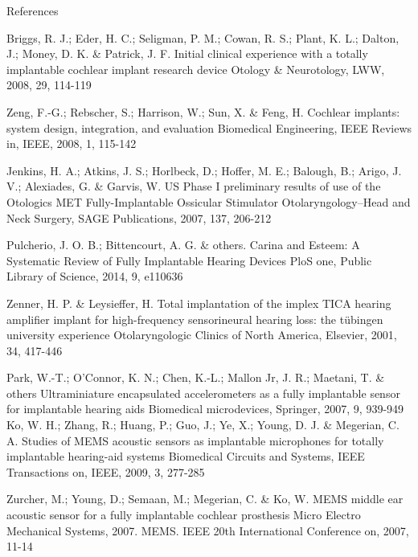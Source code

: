\documentclass[dvipsnames,12pt]{beamer}
\begin{document}
\begin{frame}[allowframebreaks]{References}
 
 
 \renewcommand{\refname}{\normalfont\selectfont\normalsize}
 \justifying
 \begin{thebibliography}{5}
\begin{footnotesize}
\begin{justifying}


Briggs, R. J.; Eder, H. C.; Seligman, P. M.; Cowan, R. S.; Plant, K. L.; Dalton, J.; Money, D. K. \& Patrick, J. F. Initial clinical experience with a totally implantable cochlear implant research device Otology \& Neurotology, LWW, 2008, 29, 114-119

Zeng, F.-G.; Rebscher, S.; Harrison, W.; Sun, X. \& Feng, H. Cochlear implants: system design, integration, and evaluation Biomedical Engineering, IEEE Reviews in, IEEE, 2008, 1, 115-142

Jenkins, H. A.; Atkins, J. S.; Horlbeck, D.; Hoffer, M. E.; Balough, B.; Arigo, J. V.; Alexiades, G. \& Garvis, W. US Phase I preliminary results of use of the Otologics MET Fully-Implantable Ossicular Stimulator Otolaryngology--Head and Neck Surgery, SAGE Publications, 2007, 137, 206-212

Pulcherio, J. O. B.; Bittencourt, A. G. \& others. Carina and Esteem: A Systematic Review of Fully Implantable Hearing Devices PloS one, Public Library of Science, 2014, 9, e110636


Zenner, H. P. \& Leysieffer, H. Total implantation of the implex TICA hearing amplifier implant for high-frequency sensorineural hearing loss: the tübingen university experience Otolaryngologic Clinics of North America, Elsevier, 2001, 34, 417-446


Park, W.-T.; O'Connor, K. N.; Chen, K.-L.; Mallon Jr, J. R.; Maetani, T. \& others Ultraminiature encapsulated accelerometers as a fully implantable sensor for implantable hearing aids Biomedical microdevices, Springer, 2007, 9, 939-949
Ko, W. H.; Zhang, R.; Huang, P.; Guo, J.; Ye, X.; Young, D. J. \& Megerian, C. A. Studies of MEMS acoustic sensors as implantable microphones for totally implantable hearing-aid systems Biomedical Circuits and Systems, IEEE Transactions on, IEEE, 2009, 3, 277-285

Zurcher, M.; Young, D.; Semaan, M.; Megerian, C. \& Ko, W. MEMS middle ear acoustic sensor for a fully implantable cochlear prosthesis Micro Electro Mechanical Systems, 2007. MEMS. IEEE 20th International Conference on, 2007, 11-14


\end{justifying}
\end{footnotesize}
\end{thebibliography}
\end{frame}
\end{document}
